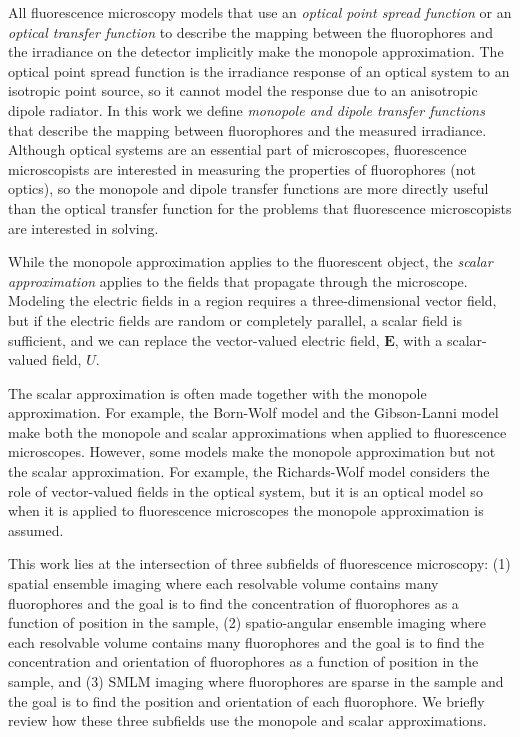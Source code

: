 \documentclass[]{osa-article}
\providecommand{\mb}[1]{\mathbf{#1}}
\begin{document}
All fluorescence microscopy models that use an \textit{optical point spread
  function} or an \textit{optical transfer function} to describe the mapping
between the fluorophores and the irradiance on the detector implicitly make the
monopole approximation. The optical point spread function is the irradiance
response of an optical system to an isotropic point source, so it cannot model
the response due to an anisotropic dipole radiator. In this work we define
\textit{monopole and dipole transfer functions} that describe the mapping
between fluorophores and the measured irradiance. Although optical systems are
an essential part of microscopes, fluorescence microscopists are interested in
measuring the properties of fluorophores (not optics), so the monopole and
dipole transfer functions are more directly useful than the optical transfer
function for the problems that fluorescence microscopists are interested in
solving.

While the monopole approximation applies to the fluorescent object, the
\textit{scalar approximation} applies to the fields that propagate through the
microscope. Modeling the electric fields in a region requires a
three-dimensional vector field, but if the electric fields are random or
completely parallel, a scalar field is sufficient, and we can replace the
vector-valued electric field, $\mb{E}$, with a scalar-valued field, $U$.

The scalar approximation is often made together with the monopole approximation.
For example, the Born-Wolf model \cite{born1980} and the Gibson-Lanni model
\cite{gibson89} make both the monopole and scalar approximations when applied to
fluorescence microscopes. However, some models make the monopole approximation
but not the scalar approximation. For example, the Richards-Wolf model
\cite{richards} considers the role of vector-valued fields in the optical
system, but it is an optical model so when it is applied to fluorescence
microscopes the monopole approximation is assumed. 

This work lies at the intersection of three subfields of fluorescence
microscopy: (1) spatial ensemble imaging where each resolvable volume contains
many fluorophores and the goal is to find the concentration of fluorophores as a
function of position in the sample, (2) spatio-angular ensemble imaging where
each resolvable volume contains many fluorophores and the goal is to find the
concentration and orientation of fluorophores as a function of position in the
sample, and (3) SMLM imaging where fluorophores are sparse in the sample and the
goal is to find the position and orientation of each fluorophore. We briefly
review how these three subfields use the monopole and scalar approximations.
\end{document}
